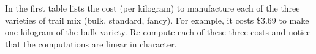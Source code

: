 In  the first table lists the cost (per kilogram) to manufacture each of the three varieties of trail mix (bulk, standard, fancy).  For example, it costs \$3.69 to make one kilogram of the bulk variety.  Re-compute each of these three costs and notice that the computations are linear in character.
